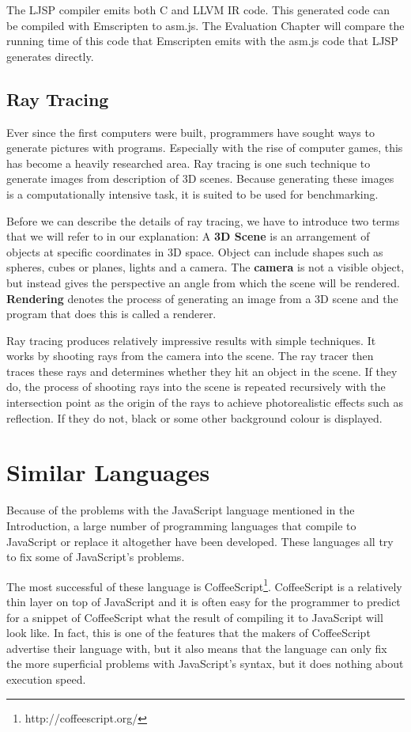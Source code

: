 \documentclass[11pt]{report}
\begin{document}
The LJSP compiler emits both C and LLVM IR code. This generated code can be compiled with Emscripten to asm.js. The Evaluation Chapter will compare the running time of this code that Emscripten emits with the asm.js code that LJSP generates directly.

\subsection{Ray Tracing}
Ever since the first computers were built, programmers have sought ways to generate pictures with programs. Especially with the rise of computer games, this has become a heavily researched area. Ray tracing is one such technique to generate images from description of 3D scenes. Because generating these images is a computationally intensive task, it is suited to be used for benchmarking.

Before we can describe the details of ray tracing, we have to introduce two terms that we will refer to in our explanation: A \textbf{3D Scene} is an arrangement of objects at specific coordinates in 3D space. Object can include shapes such as spheres, cubes or planes, lights and a camera. The \textbf{camera} is not a visible object, but instead gives the perspective an angle from which the scene will be rendered. \textbf{Rendering} denotes the process of generating an image from a 3D scene and the program that does this is called a renderer.

Ray tracing produces relatively impressive results with simple techniques. It works by shooting rays from the camera into the scene. The ray tracer then traces these rays and determines whether they hit an object in the scene. If they do, the process of shooting rays into the scene is repeated recursively with the intersection point as the origin of the rays to achieve photorealistic effects such as reflection. If they do not, black or some other background colour is displayed.

\section{Similar Languages}
Because of the problems with the JavaScript language mentioned in the Introduction, a large number of programming languages that compile to JavaScript or replace it altogether have been developed. These languages all try to fix some of JavaScript's problems.

The most successful of these language is CoffeeScript\footnote{http://coffeescript.org/}. CoffeeScript is a relatively thin layer on top of JavaScript and it is often easy for the programmer to predict for a snippet of CoffeeScript what the result of compiling it to JavaScript will look like. In fact, this is one of the features that the makers of CoffeeScript advertise their language with, but it also means that the language can only fix the more superficial problems with JavaScript's syntax, but it does nothing about execution speed.
\end{document}
